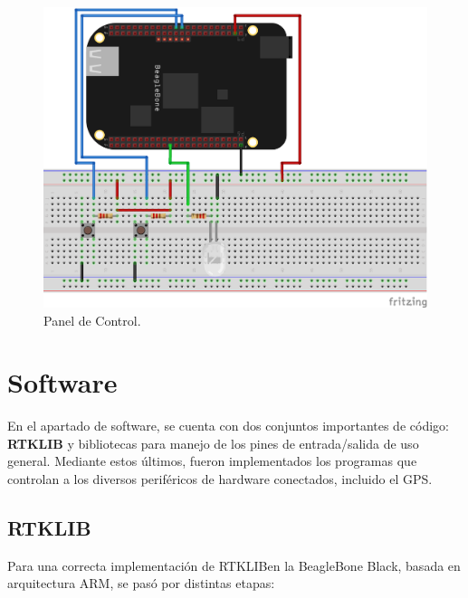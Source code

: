 \begin{figure}[H]
\centering
\includegraphics[scale=0.75]{Figures/ControlPanel}
\caption[Panel del Control.]{Panel de Control.}
\label{fig:ContPan}
\end{figure}

\section{Software}

En el apartado de software, se cuenta con dos conjuntos importantes de código: \textbf{RTKLIB} y bibliotecas para manejo de los pines de entrada/salida de uso general. Mediante estos últimos, fueron implementados los programas que controlan a los diversos periféricos de hardware conectados, incluido el GPS.

\subsection{RTKLIB}

Para una correcta implementación de RTKLIB\footnotemark en la BeagleBone Black, basada en arquitectura ARM, se pasó por distintas etapas:\\


